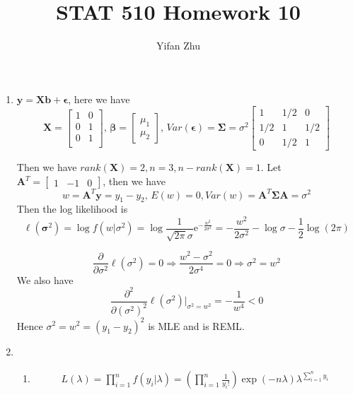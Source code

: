 \documentclass{article}
\begin{document}
\setcounter{MaxMatrixCols}{20}



\title{STAT 510 Homework 10}
\author{Yifan Zhu}
\maketitle

\begin{enumerate}[leftmargin = 0 em, label = \arabic*., font = \bfseries]
	\item
	$\bm y = \bm X \bm b + \bm \epsilon$, here we have
	\[\bm X = \begin{bmatrix}
		1 & 0\\
		0 & 1\\
		0 & 1\\
	\end{bmatrix},\, \bm \beta = \begin{bmatrix}
		\mu_1 \\ \mu_2
	\end{bmatrix} ,\, Var(\bm \epsilon)  = \bm \Sigma= \sigma^2 \begin{bmatrix}
		1 & 1/2 & 0\\
		1/2 & 1 & 1/2\\
		0 & 1/2 & 1
	\end{bmatrix}\]

	Then we have $rank (\bm X) = 2, n = 3, n - rank(\bm X) = 1$. Let $\bm A^T = \begin{bmatrix}
		1 & -1 & 0
	\end{bmatrix}$, then we have 
	\[ w = \bm A^T \bm y = y_1 - y_2,\, E(w) = 0, Var(w) = \bm A^T \bm \Sigma \bm A = \sigma^2\]
	Then the log likelihood is 
	\[\ell (\bm \sigma^2) = \log f(w | \sigma^2) = \log \frac{1}{\sqrt{2 \pi} \sigma} \mathrm{e}^{- \frac{w^2}{2 \sigma^2}} = - \frac{w^2}{2 \sigma^2} - \log \sigma - \frac{1}{2} \log(2 \pi)\]

	\[\frac{\partial}{\partial \sigma^2} \ell (\sigma^2) = 0 \Rightarrow \frac{w^2 - \sigma^2}{2 \sigma^4} = 0 \Rightarrow \sigma^2 = w^2\]
	We also have 
	\[\frac{\partial^2}{\partial (\sigma^2)^2} \ell (\sigma^2) \bigg |_{\sigma^2 = w^2}= - \frac{1}{w^4} < 0 \]
	Hence $\sigma^2 = w^2 = (y_1 - y_2)^2$ is MLE and is REML.

	\item 
	\begin{enumerate}
		\item 
		\begin{align*}
		 L(\lambda) = \prod_{i=1}^n f(y_i | \lambda) = \left( \prod_{i=1}^n \frac{1}{y_i !}\right) \exp(-n \lambda) \lambda^{\sum_{i=1}^n y_i} 
		 \end{align*}


\end{enumerate}
\end{enumerate}
\end{document}
